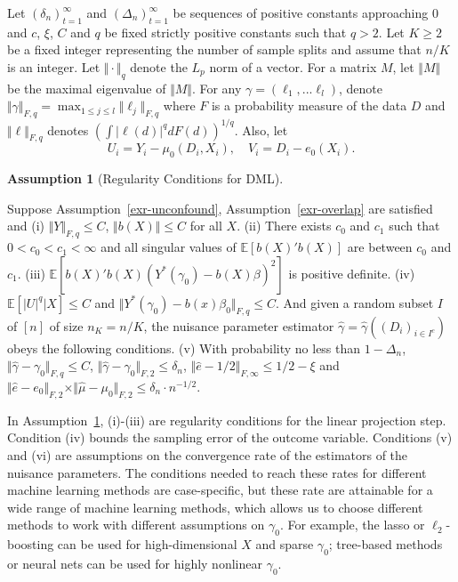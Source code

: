 \documentclass[
  12pt,
  12pt]{article}
\numberwithin{equation}{section}
\theoremstyle{definition}
\newtheorem{exercise}{Assumption}[section]
\theoremstyle{plain}
\theoremstyle{plain}
\theoremstyle{remark}
\begin{document}
Let \((\delta_n)_{t = 1}^\infty\) and \((\Delta_n)_{t = 1}^\infty\) be
sequences of positive constants approaching \(0\) and \(c\), \(\xi\),
\(C\) and \(q\) be fixed strictly positive constants such that
\(q > 2\). Let \(K \geqslant 2\) be a fixed integer representing the
number of sample splits and assume that \(n/K\) is an integer. Let
\(\Vert \cdot \Vert_q\) denote the \(L_p\) norm of a vector. For a
matrix \(M\), let \(\Vert M \Vert\) be the maximal eigenvalue of
\(\Vert M \Vert\). For any \(\gamma = (\ell_1, ... \ell_l)\), denote
\(\Vert\gamma\Vert_{F, q} = \max_{1 \leqslant j \leqslant l} \Vert\ell_j\Vert_{F, q}\)
where \(F\) is a probability measure of the data \(D\) and
\(\Vert\ell\Vert_{F, q}\) denotes
\((\int \vert\ell(d)\vert^qdF(d))^{1/q}\). Also, let \[
U_i = Y_i - \mu_0(D_i, X_i), \quad V_i = D_i - e_0(X_i).
\]

\begin{exercise}[Regularity Conditions for
DML]\protect\hypertarget{exr-dml}{}\label{exr-dml}

Suppose Assumption~\ref{exr-unconfound}, Assumption~\ref{exr-overlap}
are satisfied and (i) \(\Vert Y \Vert_{F, q} \leqslant C\),
\(\Vert b(X) \Vert \leqslant C\) for all \(X\). (ii) There exists
\(c_0\) and \(c_1\) such that \(0 < c_0 < c_1 < \infty\) and all
singular values of \(\mathbb{E}[b(X)'b(X)]\) are between \(c_0\) and
\(c_1\). (iii) \(\mathbb{E}[b(X)'b(X)(Y^*(\gamma_0) - b(X)\beta)^2]\) is
positive definite. (iv) \(\mathbb{E}[|U|^q|X] \leqslant C\) and
\(\Vert Y^*(\gamma_0) - b(x)\beta_0 \Vert_{F, q} \leqslant C\). And
given a random subset \(I\) of \([n]\) of size \(n_K = n/K\), the
nuisance parameter estimator
\(\hat\gamma = \hat\gamma((D_i)_{i \in I^c})\) obeys the following
conditions. (v) With probability no less than \(1 - \Delta_n\),
\(\Vert\hat\gamma - \gamma_0\Vert_{F, q} \leqslant C\),
\(\Vert\hat\gamma - \gamma_0\Vert_{F, 2} \leqslant \delta_n\),
\(\Vert \hat{e} - 1/2 \Vert_{F, \infty} \leqslant 1/2 - \xi\) and
\(\Vert\hat{e} - e_0\Vert_{F, 2} \times \Vert\hat\mu - \mu_0\Vert_{F, 2} \leqslant \delta_n\cdot n^{-1/2}\).

\end{exercise}

In Assumption~\ref{exr-dml}, (i)-(iii) are regularity conditions for the
linear projection step. Condition (iv) bounds the sampling error of the
outcome variable. Conditions (v) and (vi) are assumptions on the
convergence rate of the estimators of the nuisance parameters. The
conditions needed to reach these rates for different machine learning
methods are case-specific, but these rate are attainable for a wide
range of machine learning methods, which allows us to choose different
methods to work with different assumptions on \(\gamma_0\). For example,
the lasso or \(\ell_2\)-boosting can be used for high-dimensional \(X\)
and sparse \(\gamma_0\); tree-based methods or neural nets can be used
for highly nonlinear \(\gamma_0\).
\end{document}
